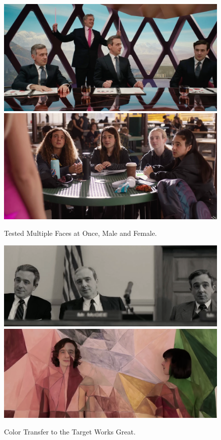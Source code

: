 \documentclass[
  a4paper,  %
  twoside,  %
  bibliography=totoc,
  headsepline,
  cleardoublepage=empty,
  parskip=half,
  draft=false
]{scrbook}
\begin{document}
\begin{figure}[h]
  \centering
  \includegraphics[width=1\textwidth]{./graphics/inswapper/multiple1.png}
  \includegraphics[width=1\textwidth]{./graphics/inswapper/multiple2.png}
  \caption{Tested Multiple Faces at Once, Male and Female.}
\end{figure}
\begin{figure}[h]
  \centering
  \includegraphics[width=1\textwidth]{./graphics/inswapper/oppenheimer2.png}
  \includegraphics[width=1\textwidth]{./graphics/inswapper/kimbra.png}
  \caption{Color Transfer to the Target Works Great.}
\end{figure}
\end{document}
